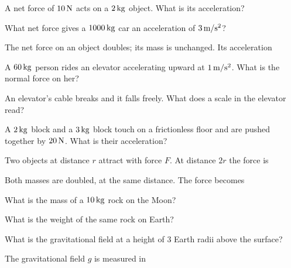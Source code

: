 \begin{exo}{}
A net force of $10\N$ acts on a $2\,\mathrm{kg}$ object. What is its acceleration?
\choices{$20\mss$}{$5\mss$}{$0.2\mss$}{$12\mss$}
\end{exo}
\begin{exo}{}
What net force gives a $1000\,\mathrm{kg}$ car an acceleration of $3\,\mathrm{m/s^2}$?
\end{exo}
\begin{exo}{}
The net force on an object doubles; its mass is unchanged. Its acceleration
\end{exo}
\begin{exo}{}
A $60\,\mathrm{kg}$ person rides an elevator accelerating upward at $1\,\mathrm{m/s^2}$. What is the normal force on her?
\choices{$540\N$}{$600\N$}{$60\N$}{$660\N$}
\end{exo}
\begin{exo}{}
An elevator's cable breaks and it falls freely. What does a scale in the elevator read?
\end{exo}
\begin{exo}{}
A $2\,\mathrm{kg}$ block and a $3\,\mathrm{kg}$ block touch on a frictionless floor and are pushed together by $20\,\mathrm{N}$. What is their acceleration?
\choices{$10\mss$}{$4\mss$}{$6.7\mss$}{$20\mss$}
\end{exo}

\begin{exo}{}
Two objects at distance $r$ attract with force $F$. At distance $2r$ the force is
\end{exo}
\begin{exo}{}
Both masses are doubled, at the same distance. The force becomes
\end{exo}
\begin{exo}{}
What is the mass of a $10\,\mathrm{kg}$ rock on the Moon?
\end{exo}
\begin{exo}{}
What is the weight of the same rock on Earth?
\choices{$10\N$}{$1000\N$}{$1\N$}{$100\N$}
\end{exo}
\begin{exo}{}
What is the gravitational field at a height of $3$ Earth radii above the surface?
\end{exo}
\begin{exo}{}
The gravitational field $g$ is measured in
\end{exo}

